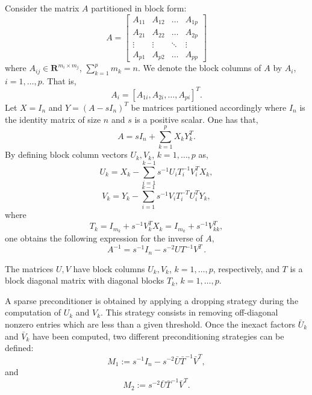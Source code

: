 \documentclass{report}
\begin{document}
Consider the matrix $A$ partitioned in block form:
\begin{equation}\label{equ:Apartitioned}
A = \left[ \begin{array}{cccc}
A_{11} & A_{12} & \ldots & A_{1p}\\
A_{21} & A_{22} & \ldots & A_{2p}\\
\vdots & \vdots & \ddots & \vdots\\
A_{p1} & A_{p2} & \ldots & A_{pp} \end{array} \right]
\end{equation}
where $A_{ij} \in \mathbf{R}^{m_i \times m_j}$, $\sum_{k=1}^{p} m_k = n$.
We denote the block columns of $A$ by $A_i$, $i=1,\ldots,p$. That is,
\[ A_i = [A_{1i}, A_{2i},\ldots,A_{pi}]^T.\]
Let $X=I_n$ and $Y=(A - sI_n)^T$ be matrices partitioned accordingly
where $I_n$ is the identity matrix of size $n$ and $s$ is a positive scalar.
One has that,
\begin{equation}\label{equ:sumA}
A = sI_n + \sum_{k=1}^{p} X_k Y_k^T.
\end{equation}
By defining block column vectors $U_k,V_k$, $k=1,\ldots,p$ as,
\begin{equation}\label{equ:unew2}
U_{k}=X_{k}-\sum_{i=1}^{k-1}s^{-1}U_{i}T_{i}^{-1}V_{i}^{T}X_{k},
\end{equation}
\begin{equation}\label{equ:vnew2}
V_{k}=Y_{k}-\sum_{i=1}^{k-1}s^{-1}V_{i}T_{i}^{-T}U_{i}^{T}Y_{k},
\end{equation}
where
\begin{equation}\label{equ:pivotenew}
T_k = I_{m_k} + s^{-1} V_k^T X_k = I_{m_k} + s^{-1} V_{kk}^T,
\end{equation}
one obtains the following expression for the inverse of $A$,
\begin{equation}\label{equ:Afactorized}
A^{-1}= s^{-1} I_n - s^{-2} U T^{-1} V^T \, .
\end{equation}

The matrices $U, V$ have block columns $U_k, V_k$, $k=1,\ldots,p$, respectively, and
$T$ is a block diagonal matrix with diagonal blocks $T_k$, $k=1,\ldots,p$.

A sparse preconditioner is obtained by applying a dropping strategy
during the computation of $U_k$ and $V_k$. This strategy consists in
removing off-diagonal nonzero entries which are less than a given
threshold. Once the inexact factors $\bar{U}_k$ and $\bar{V}_k$ have been
computed, two different preconditioning strategies can be defined:
\begin{equation*}
M_1 := s^{-1} I_n - s^{-2} \bar{U} \bar{T}^{-1} \bar{V}^T,
\end{equation*}
and
\begin{equation*}\label{equ:AISM2}
M_2 := s^{-2} \bar{U} \bar{T}^{-1} \bar{V}^T .
\end{equation*}
\end{document}
